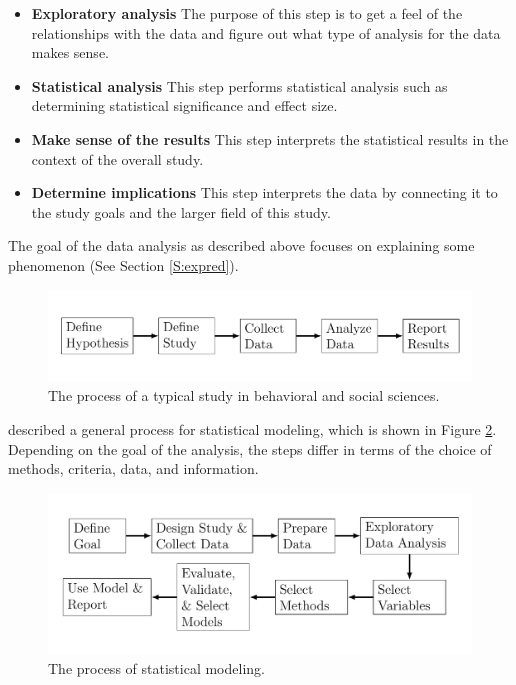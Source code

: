 \documentclass[]{book}
\theoremstyle{definition}
\theoremstyle{definition}
\theoremstyle{definition}
\theoremstyle{remark}
\begin{document}
\begin{itemize}
\item
  \textbf{Exploratory analysis} The purpose of this step is to get a
  feel of the relationships with the data and figure out what type of
  analysis for the data makes sense.
\item
  \textbf{Statistical analysis} This step performs statistical analysis
  such as determining statistical significance and effect size.
\item
  \textbf{Make sense of the results} This step interprets the
  statistical results in the context of the overall study.
\item
  \textbf{Determine implications} This step interprets the data by
  connecting it to the study goals and the larger field of this study.
\end{itemize}

The goal of the data analysis as described above focuses on explaining
some phenomenon (See Section \ref{S:expred}).

\begin{figure}

{\centering \includegraphics[width=0.8\linewidth]{Figures/Figure1} 

}

\caption{The process of a typical study in behavioral and social sciences.}\label{fig:study}
\end{figure}

\citet{shmueli2010model} described a general process for statistical
modeling, which is shown in Figure \ref{fig:modeling}. Depending on the
goal of the analysis, the steps differ in terms of the choice of
methods, criteria, data, and information.

\begin{figure}

{\centering \includegraphics[width=0.8\linewidth]{Figures/Figure2} 

}

\caption{The process of statistical modeling.}\label{fig:modeling}
\end{figure}
\end{document}
